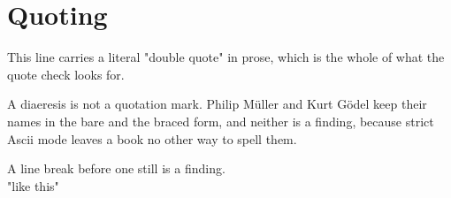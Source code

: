 \section{Quoting}
\label{sec:ch01-quoting}

This line carries a literal "double quote" in prose, which is the whole of what
the quote check looks for.

A diaeresis is not a quotation mark. Philip M\"uller and Kurt G\"{o}del keep
their names in the bare and the braced form, and neither is a finding, because
strict Ascii mode leaves a book no other way to spell them.

A line break before one still is a finding.\\"like this"
